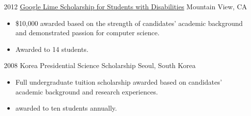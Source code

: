 \documentclass[]{patyoon-cv}
\begin{document}
\begin{entrylist}
  \entry
  {2012}
  {\href{http://www.limeconnect.com/opportunities/page/google-lime-scholarship-program}
    {Google Lime Scholarship for Students with Disabilities}}
  {Mountain View, CA}
  {\begin{itemize}
    \item \$10,000 awarded based on the strength of candidates' academic background and demonstrated passion for computer science.
    \item Awarded to 14 students.
    \end{itemize}
  }
  \entry
  {2008}
  {Korea Presidential Science Scholarship}
  {Seoul, South Korea}
  {\begin{itemize}
    \item Full undergraduate tuition scholarship awarded based on candidates' academic background and research experiences.
    \item awarded to ten students annually.
    \end{itemize}
  }
\end{entrylist}
\end{document}
